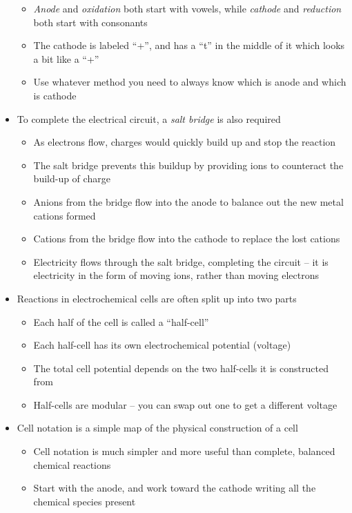 \documentclass[12pt, openany, letterpaper]{memoir}
\begin{document}
\begin{itemize}
\begin{itemize}
 		\item \emph{Anode} and \emph{oxidation} both start with vowels, while \emph{cathode} and \emph{reduction} both start with consonants
 		\item The cathode is labeled ``+'', and has a ``t'' in the middle of it which looks a bit like a ``+''
 		\item Use whatever method you need to always know which is anode and which is cathode
 	\end{itemize}
 	\item To complete the electrical circuit, a \emph{salt bridge} is also required
 	\begin{itemize}
 		\item As electrons flow, charges would quickly build up and stop the reaction
 		\item The salt bridge prevents this buildup by providing ions to counteract the build-up of charge
 		\item Anions from the bridge flow into the anode to balance out the new metal cations formed
 		\item Cations from the bridge flow into the cathode to replace the lost cations
 		\item Electricity flows through the salt bridge, completing the circuit -- it is electricity in the form of moving ions, rather than moving electrons
 	\end{itemize}
 	\item Reactions in electrochemical cells are often split up into two parts
 	\begin{itemize}
 		\item Each half of the cell is called a ``half-cell''
 		\item Each half-cell has its own electrochemical potential (voltage)
 		\item The total cell potential depends on the two half-cells it is constructed from
 		\item Half-cells are modular -- you can swap out one to get a different voltage
 	\end{itemize}
 	\item Cell notation is a simple map of the physical construction of a cell
 	\begin{itemize}
 		\item Cell notation is much simpler and more useful than complete, balanced chemical reactions
 		\item Start with the anode, and work toward the cathode writing all the chemical species present

\end{itemize}
\end{itemize}
\end{document}
